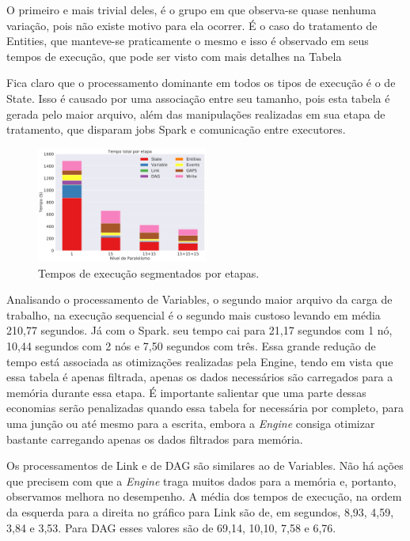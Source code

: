 O primeiro e mais trivial deles, é o grupo em que observa-se quase nenhuma 
variação, pois não existe motivo para ela ocorrer. É o caso do tratamento de 
Entities, que manteve-se praticamente o mesmo e isso é observado em seus tempos 
de execução, que pode ser visto com mais detalhes na Tabela 


Fica claro que o processamento dominante em todos 
os tipos de execução é o de State. Isso é causado por uma associação entre seu 
tamanho, pois esta tabela é gerada pelo maior arquivo, além das manipulações 
realizadas em sua etapa de tratamento, que disparam jobs Spark e comunicação 
entre executores. 





\begin{figure}[H]
\centerline{
\includegraphics[width=0.5\textwidth]{./img/total_step.pdf}}
 \caption{Tempos de execução segmentados por etapas.}
 \label{fig:total_step}
\end{figure}

Analisando o processamento de Variables, o segundo maior arquivo da carga de 
trabalho, na execução sequencial é o segundo mais custoso levando em média 
210,77 segundos. Já com o Spark. seu tempo cai para 21,17 segundos com 1 nó, 
10,44 segundos com 2 nós e 7,50 segundos com três. Essa grande redução de 
tempo está associada as otimizações realizadas pela Engine, tendo em vista que 
essa tabela é apenas filtrada, apenas os dados necessários são carregados para 
a memória durante essa etapa. É importante salientar que uma parte dessas 
economias serão penalizadas quando essa tabela for necessária por completo, 
para uma junção ou até mesmo para a escrita, embora a \emph{Engine} consiga 
otimizar bastante carregando apenas os dados filtrados para memória.

Os processamentos de Link e de DAG são similares ao de Variables. Não há ações 
que precisem com que a \emph{Engine} traga muitos dados para a memória e, 
portanto, observamos melhora no desempenho. A média dos tempos de execução, na 
ordem da esquerda para a direita no gráfico para Link são de, em segundos, 
8,93, 4,59, 3,84 e 3,53. Para DAG esses valores são de 69,14, 10,10, 7,58 e 
6,76.

